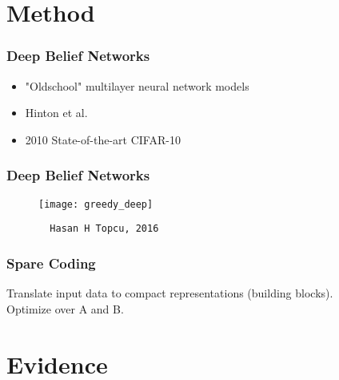 \documentclass{beamer}
\begin{document}
\section{Method}

\begin{frame}
  \frametitle{Deep Belief Networks}

  \begin{itemize}
    \item "Oldschool" multilayer neural network models
    \item Hinton et al.
    \item 2010 State-of-the-art CIFAR-10
  \end{itemize}
\end{frame}

\begin{frame}[fragile]
  \frametitle{Deep Belief Networks}

  \begin{figure}[h]
  \center
  \texttt{[image: greedy\_deep]}
  {\tiny
  \begin{verbatim}
  Hasan H Topcu, 2016
  \end{verbatim}
  }
  \end{figure}
\end{frame}

\begin{frame}
  \frametitle{Spare Coding}

    Translate input data to compact representations (building blocks).\\
    Optimize over A and B.
\end{frame}

\section{Evidence}
\end{document}
